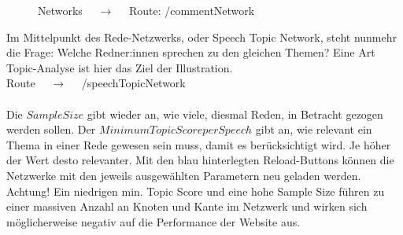 \documentclass[10pt]{report}
\begin{document}
\begin{figure}[H]
	\begin{center}		
  	 \end{center}
	\caption{Networks  $\quad\rightarrow\quad$  Route:  /commentNetwork}	
 \end{figure}
 

\noindent Im Mittelpunkt des Rede-Netzwerks, oder Speech Topic Network, steht nunmehr die Frage: Welche Redner:innen sprechen zu den gleichen Themen? Eine Art Topic-Analyse ist hier das Ziel der Illustration.\\
Route $\quad\rightarrow\quad$  /speechTopicNetwork\\\\
Die $Sample Size$ gibt wieder an, wie viele, diesmal Reden, in Betracht gezogen werden sollen. 
Der $Minimum Topic Score per Speech$ gibt an, wie relevant ein Thema in einer Rede gewesen sein muss, damit es berücksichtigt wird. Je höher der Wert desto relevanter.
Mit den blau hinterlegten Reload-Buttons können die Netzwerke mit den jeweils ausgewählten Parametern neu geladen werden.
Achtung! Ein niedrigen min. Topic Score und eine hohe Sample Size führen zu einer massiven Anzahl an Knoten und Kante im Netzwerk und wirken sich möglicherweise negativ auf die Performance der Website aus.\\\\
 
\end{document}
